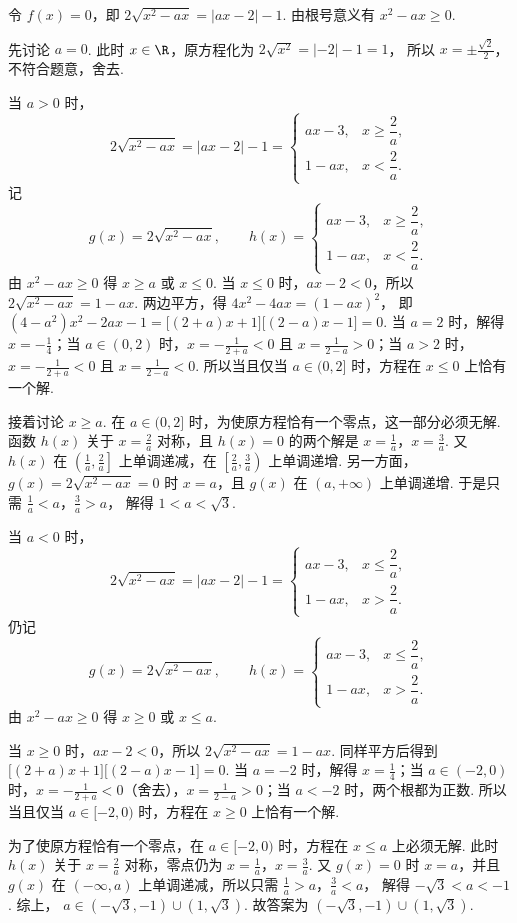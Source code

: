 \begin{solution}
令 \(f(x)=0\)，即
\(2\sqrt{x^2-ax}=|ax-2|-1\).
由根号意义有
\(x^2-ax\ge 0\).

先讨论 \(a=0\). 此时 \(x\in \R\)，原方程化为
\(2\sqrt{x^2}=|-2|-1=1\)，
所以 \(x=\pm \frac{\sqrt{2}}{2}\)，不符合题意，舍去.

当 \(a>0\) 时，
\[
2\sqrt{x^2-ax}=|ax-2|-1=
\begin{cases}
ax-3,& x\ge \dfrac{2}{a},\\[4pt]
1-ax,& x<\dfrac{2}{a}.
\end{cases}
\]
记
\[
g(x)=2\sqrt{x^2-ax},\qquad
h(x)=
\begin{cases}
ax-3,& x\ge \dfrac{2}{a},\\[4pt]
1-ax,& x<\dfrac{2}{a}.
\end{cases}
\]
由 \(x^2-ax\ge 0\) 得 \(x\ge a\) 或 \(x\le 0\).
当 \(x\le 0\) 时，\(ax-2<0\)，所以
\(2\sqrt{x^2-ax}=1-ax\).
两边平方，得
\(4x^2-4ax=(1-ax)^2\)，
即
\((4-a^2)x^2-2ax-1=\bigl[(2+a)x+1\bigr]\bigl[(2-a)x-1\bigr]=0\).
当 \(a=2\) 时，解得 \(x=-\frac14\)；当 \(a\in(0,2)\) 时，\(x=-\frac{1}{2+a}<0\) 且 \(x=\frac{1}{2-a}>0\)；当 \(a>2\) 时，\(x=-\frac{1}{2+a}<0\) 且 \(x=\frac{1}{2-a}<0\). 所以当且仅当 \(a\in(0,2]\) 时，方程在 \(x\le 0\) 上恰有一个解.

接着讨论 \(x\ge a\). 在 \(a\in(0,2]\) 时，为使原方程恰有一个零点，这一部分必须无解. 函数 \(h(x)\) 关于 \(x=\frac{2}{a}\) 对称，且
\(h(x)=0\)
的两个解是
\(x=\frac{1}{a}\)，\(x=\frac{3}{a}\).
又 \(h(x)\) 在 \(\left(\frac{1}{a},\frac{2}{a}\right]\) 上单调递减，在 \(\left[\frac{2}{a},\frac{3}{a}\right)\) 上单调递增. 另一方面，
\(g(x)=2\sqrt{x^2-ax}=0\)
时 \(x=a\)，且 \(g(x)\) 在 \((a,+\infty)\) 上单调递增. 于是只需
\(\frac{1}{a}<a\)，\(\frac{3}{a}>a\)，
解得
\(1<a<\sqrt{3}\).

当 \(a<0\) 时，
\[
2\sqrt{x^2-ax}=|ax-2|-1=
\begin{cases}
ax-3,& x\le \dfrac{2}{a},\\[4pt]
1-ax,& x>\dfrac{2}{a}.
\end{cases}
\]
仍记
\[
g(x)=2\sqrt{x^2-ax},\qquad
h(x)=
\begin{cases}
ax-3,& x\le \dfrac{2}{a},\\[4pt]
1-ax,& x>\dfrac{2}{a}.
\end{cases}
\]
由 \(x^2-ax\ge 0\) 得 \(x\ge 0\) 或 \(x\le a\).

当 \(x\ge 0\) 时，\(ax-2<0\)，所以
\(2\sqrt{x^2-ax}=1-ax\).
同样平方后得到
\(\bigl[(2+a)x+1\bigr]\bigl[(2-a)x-1\bigr]=0\).
当 \(a=-2\) 时，解得 \(x=\frac14\)；当 \(a\in(-2,0)\) 时，\(x=-\frac{1}{2+a}<0\)（舍去），\(x=\frac{1}{2-a}>0\)；当 \(a<-2\) 时，两个根都为正数. 所以当且仅当 \(a\in[-2,0)\) 时，方程在 \(x\ge 0\) 上恰有一个解.

为了使原方程恰有一个零点，在 \(a\in[-2,0)\) 时，方程在 \(x\le a\) 上必须无解. 此时 \(h(x)\) 关于 \(x=\frac{2}{a}\) 对称，零点仍为
\(x=\frac{1}{a}\)，\(x=\frac{3}{a}\).
又 \(g(x)=0\) 时 \(x=a\)，并且 \(g(x)\) 在 \((-\infty,a)\) 上单调递减，所以只需
\(\frac{1}{a}>a\)，\(\frac{3}{a}<a\)，
解得
\(-\sqrt{3}<a<-1\).
综上，
\(a\in(-\sqrt{3},-1)\cup(1,\sqrt{3})\).
故答案为 \((-\sqrt{3},-1)\cup(1,\sqrt{3})\).
\end{solution}
